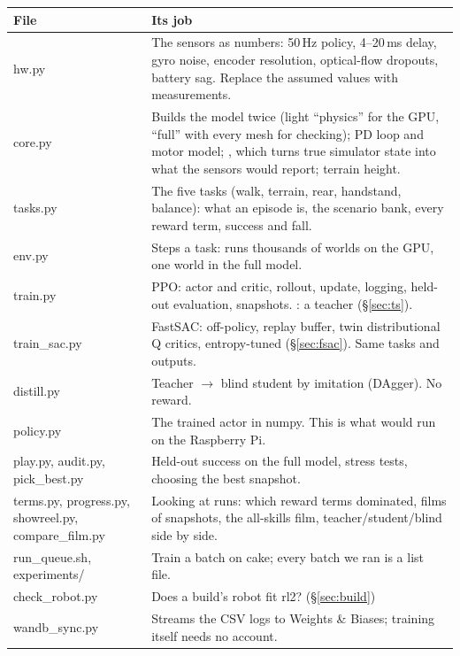 \documentclass[10pt,letterpaper]{article}
\newcommand{\cc}[1]{\texttt{\detokenize{#1}}}
\begin{document}
\begin{small}
\begin{tabularx}{\linewidth}{@{}>{\raggedright\ttfamily}p{3.6cm}X@{}}
\toprule
\normalfont\textbf{File} & \textbf{Its job} \\ \midrule
hw.py & The sensors as numbers: 50\,Hz policy, 4–20\,ms delay, gyro noise, encoder resolution, optical-flow dropouts, battery sag. Replace the assumed values with measurements. \\
core.py & Builds the model twice (light ``physics'' for the GPU, ``full'' with every mesh for checking); PD loop and motor model; \cc{sense()}, which turns true simulator state into what the sensors would report; terrain height. \\
tasks.py & The five tasks (walk, terrain, rear, handstand, balance): what an episode is, the scenario bank, every reward term, success and fall. \\
env.py & Steps a task: \cc{GpuEnv} runs thousands of worlds on the GPU, \cc{CpuEnv} one world in the full model. \\
train.py & PPO: actor and critic, rollout, update, logging, held-out evaluation, snapshots. \cc{--teacher=1}: a teacher (§\ref{sec:ts}). \\
train\_sac.py & FastSAC: off-policy, replay buffer, twin distributional Q critics, entropy-tuned (§\ref{sec:fsac}). Same tasks and outputs. \\
distill.py & Teacher $\to$ blind student by imitation (DAgger). No reward. \\
policy.py & The trained actor in numpy. This is what would run on the Raspberry Pi. \\
play.py, audit.py, pick\_best.py & Held-out success on the full model, stress tests, choosing the best snapshot. \\
terms.py, progress.py, showreel.py, compare\_film.py & Looking at runs: which reward terms dominated, films of snapshots, the all-skills film, teacher/student/blind side by side. \\
run\_queue.sh, experiments/ & Train a batch on cake; every batch we ran is a list file. \\
check\_robot.py & Does a build's robot fit rl2? (§\ref{sec:build}) \\
wandb\_sync.py & Streams the CSV logs to Weights \& Biases; training itself needs no account. \\ \bottomrule
\end{tabularx}
\end{small}
\end{document}
